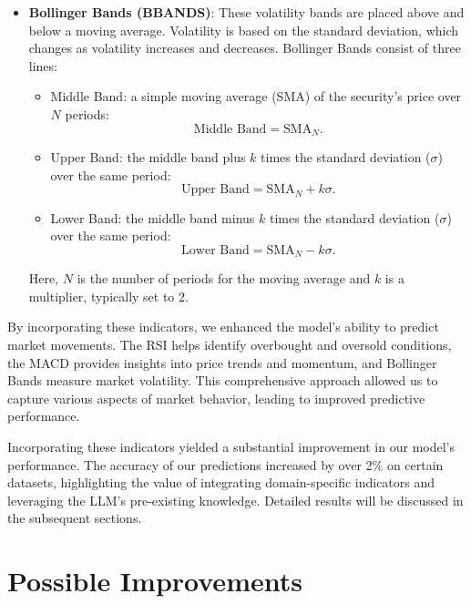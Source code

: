 \begin{itemize}
	\item \textbf{Bollinger Bands (BBANDS)}: These volatility bands are placed above and below a moving average. Volatility is based on the standard deviation, which changes as volatility increases and decreases. Bollinger Bands consist of three lines:

	      \begin{itemize}
		      \item Middle Band: a simple moving average (SMA) of the security's price over \( N \) periods:
		            \[
			            \text{Middle Band} = \text{SMA}_{N}.
		            \]

		      \item Upper Band: the middle band plus \( k \) times the standard deviation (\( \sigma \)) over the same period:
		            \[
			            \text{Upper Band} = \text{SMA}_{N} + k\sigma.
		            \]

		      \item Lower Band: the middle band minus \( k \) times the standard deviation (\( \sigma \)) over the same period:
		            \[
			            \text{Lower Band} = \text{SMA}_{N} - k\sigma.
		            \]
	      \end{itemize}
	      Here, \( N \) is the number of periods for the moving average and \( k \) is a multiplier, typically set to 2.
\end{itemize}

By incorporating these indicators, we enhanced the model's ability to predict market movements. The RSI helps identify overbought and oversold conditions, the MACD provides insights into price trends and momentum, and Bollinger Bands measure market volatility. This comprehensive approach allowed us to capture various aspects of market behavior, leading to improved predictive performance.

Incorporating these indicators yielded a substantial improvement in our model's performance. The accuracy of our predictions increased by over 2\% on certain datasets, highlighting the value of integrating domain-specific indicators and leveraging the LLM's pre-existing knowledge. Detailed results will be discussed in the subsequent sections.

\section{Possible Improvements}

